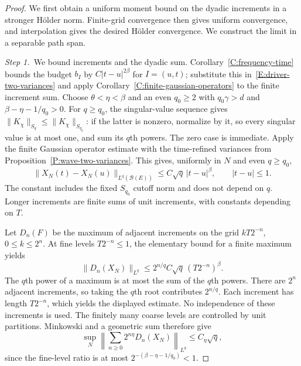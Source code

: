 \begin{proof}
  We first obtain a uniform moment bound on the dyadic increments in a
  stronger Hölder norm. Finite-grid convergence then gives uniform
  convergence, and interpolation gives the desired Hölder convergence. We
  construct the limit in a separable path span.

  \medskip
  \noindent\textit{Step 1.~}We bound increments and the dyadic sum.
  Corollary~\ref{C:frequency-time} bounds the budget $b_I$ by
  $C|t-u|^{2\beta}$ for $I=(u,t)$; substitute this
  in~\eqref{E:driver-two-variances} and apply
  Corollary~\ref{C:finite-gaussian-operators} to the finite increment sum.
  Choose $\theta < \eta < \beta$ and an even $q_0 \ge 2$ with $q_0\gamma > d$
  and $\beta-\eta-1/q_0 > 0$. For $q \ge q_0$, the singular-value sequence gives
  $\|K_\chi\|_{S_q} \le \|K_\chi\|_{S_{q_0}}$: if the latter is nonzero,
  normalize by it, so every singular value is at most one, and sum its $q$th
  powers. The zero case is immediate. Apply the finite Gaussian operator
  estimate with the time-refined variances from
  Proposition~\ref{P:wave-two-variances}. This gives, uniformly in $N$ and even
  $q \ge q_0$,
  \begin{equation}\label{E:driver-increment-moments}
    \|X_N(t)-X_N(u)\|_{L^q(\mathcal{B}(E))}
    \le C\sqrt q\,|t-u|^\beta,\qquad |t-u|\le1.
  \end{equation}
  The constant includes the fixed $S_{q_0}$ cutoff norm and does not depend on
  $q$. Longer increments are finite sums of unit increments, with constants
  depending on $T$.

  Let $D_n(F)$ be the maximum of adjacent increments on the grid $kT2^{-n}$, $0
  \le k \le 2^n$. At fine levels $T2^{-n} \le 1$, the elementary bound for a
  finite maximum yields
  \[
    \|D_n(X_N)\|_{L^q}
    \le 2^{n/q}C\sqrt q\,(T2^{-n})^\beta.
  \]
  The $q$th power of a maximum is at most the sum of the $q$th powers. There
  are $2^n$ adjacent increments, so taking the $q$th root contributes
  $2^{n/q}$. Each increment has length $T2^{-n}$, which yields the displayed
  estimate.
  No independence of these increments is used. The finitely many coarse levels
  are controlled by unit partitions. Minkowski and a geometric sum therefore
  give
  \begin{equation}\label{E:driver-dyadic-moment-sum}
    \sup_N\left\|\sum_{n\ge0}2^{n\eta}D_n(X_N)\right\|_{L^q}
    \le C_\eta\sqrt q,
  \end{equation}
  since the fine-level ratio is at most $2^{-(\beta-\eta-1/q_0)} < 1$.


\end{proof}
